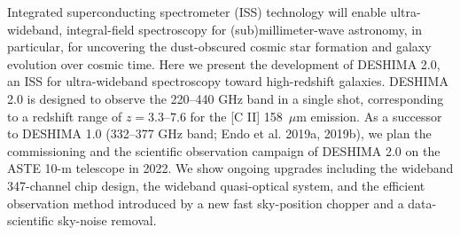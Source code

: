 \documentclass[ja]{2022a}
\begin{document}
Integrated superconducting spectrometer (ISS) technology will enable ultra-wideband, integral-field spectroscopy for (sub)millimeter-wave astronomy, in particular, for uncovering the dust-obscured cosmic star formation and galaxy evolution over cosmic time.
Here we present the development of DESHIMA 2.0, an ISS for ultra-wideband spectroscopy toward high-redshift galaxies.
DESHIMA 2.0 is designed to observe the 220--440 GHz band in a single shot, corresponding to a redshift range of $z=3.3\textrm{--}7.6$ for the [C II] 158~$\mu$m emission.
As a successor to DESHIMA 1.0 (332--377 GHz band; Endo et al. 2019a, 2019b), we plan the commissioning and the scientific observation campaign of DESHIMA 2.0 on the ASTE 10-m telescope in 2022.
We show ongoing upgrades including the wideband 347-channel chip design, the wideband quasi-optical system, and the efficient observation method introduced by a new fast sky-position chopper and a data-scientific sky-noise removal.
\end{document}
